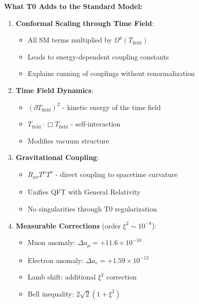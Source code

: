 	\textbf{What T0 Adds to the Standard Model:}
	
	\begin{tcolorbox}[colback=blue!5!white,colframe=blue!75!black,title=T0 Contributions to the Extended Lagrange Density]
		\begin{enumerate}
			\item \textbf{Conformal Scaling through Time Field}:
			\begin{itemize}
				\item All SM terms multiplied by $\Omega^4(T_{\text{field}})$
				\item Leads to energy-dependent coupling constants
				\item Explains running of couplings without renormalization
			\end{itemize}
			
			\item \textbf{Time Field Dynamics}:
			\begin{itemize}
				\item $(\partial T_{\text{field}})^2$ - kinetic energy of the time field
				\item $T_{\text{field}} \cdot \Box T_{\text{field}}$ - self-interaction
				\item Modifies vacuum structure
			\end{itemize}
			
			\item \textbf{Gravitational Coupling}:
			\begin{itemize}
				\item $R_{\mu\nu} T^{\mu} T^{\nu}$ - direct coupling to spacetime curvature
				\item Unifies QFT with General Relativity
				\item No singularities through T0 regularization
			\end{itemize}
			
			\item \textbf{Measurable Corrections} (order $\xi^2 \sim 10^{-8}$):
			\begin{itemize}
				\item Muon anomaly: $\Delta a_{\mu} = +11.6 \times 10^{-10}$
				\item Electron anomaly: $\Delta a_{e} = +1.59 \times 10^{-12}$
				\item Lamb shift: additional $\xi^2$ correction
				\item Bell inequality: $2\sqrt{2}(1 + \xi^2)$
			\end{itemize}
		\end{enumerate}
	\end{tcolorbox}
	
